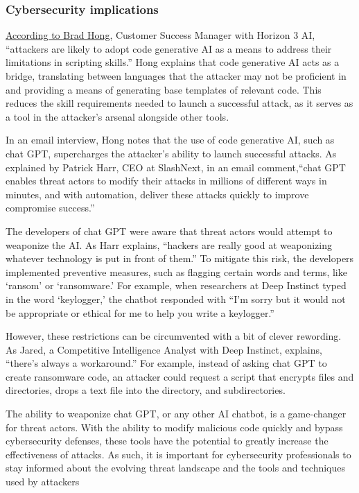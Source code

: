 \subsubsection{Cybersecurity implications}
\href{https://securityintelligence.com/news/are-threat-actors-using-chatgpt-to-hack-your-network/}{According to Brad Hong}, Customer Success Manager with Horizon 3 AI, ``attackers are likely to adopt code generative AI as a means to address their limitations in scripting skills.'' Hong explains that code generative AI acts as a bridge, translating between languages that the attacker may not be proficient in and providing a means of generating base templates of relevant code. This reduces the skill requirements needed to launch a successful attack, as it serves as a tool in the attacker's arsenal alongside other tools.\par
In an email interview, Hong notes that the use of code generative AI, such as chat GPT, supercharges the attacker's ability to launch successful attacks. As explained by Patrick Harr, CEO at SlashNext, in an email comment,``chat GPT enables threat actors to modify their attacks in millions of different ways in minutes, and with automation, deliver these attacks quickly to improve compromise success.''\par
The developers of chat GPT were aware that threat actors would attempt to weaponize the AI. As Harr explains, ``hackers are really good at weaponizing whatever technology is put in front of them.'' To mitigate this risk, the developers implemented preventive measures, such as flagging certain words and terms, like `ransom' or `ransomware.' For example, when researchers at Deep Instinct typed in the word `keylogger,' the chatbot responded with ``I'm sorry but it would not be appropriate or ethical for me to help you write a keylogger.''\par
However, these restrictions can be circumvented with a bit of clever rewording. As Jared, a Competitive Intelligence Analyst with Deep Instinct, explains, ``there's always a workaround.'' For example, instead of asking chat GPT to create ransomware code, an attacker could request a script that encrypts files and directories, drops a text file into the directory, and subdirectories.\par
The ability to weaponize chat GPT, or any other AI chatbot, is a game-changer for threat actors. With the ability to modify malicious code quickly and bypass cybersecurity defenses, these tools have the potential to greatly increase the effectiveness of attacks. As such, it is important for cybersecurity professionals to stay informed about the evolving threat landscape and the tools and techniques used by attackers \cite{brundage2018malicious}

